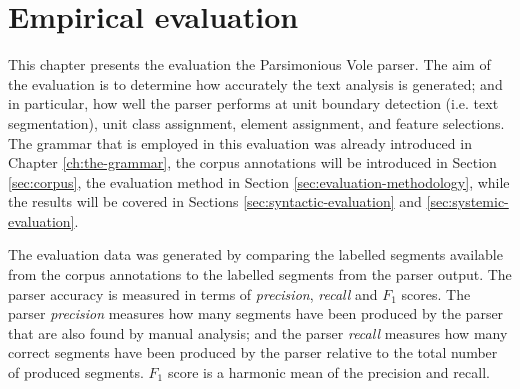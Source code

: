 \chapter{Empirical evaluation}
\label{ch:evaluation}



    This chapter presents the evaluation the Parsimonious Vole parser. The aim of the evaluation is to determine how accurately the text analysis is generated; and in particular, how well the parser performs at unit boundary detection (i.e. text segmentation), unit class assignment, element assignment, and feature selections. The grammar that is employed in this evaluation was already introduced in Chapter \ref{ch:the-grammar}, the corpus annotations will be introduced in Section \ref{sec:corpus}, the evaluation method in Section \ref{sec:evaluation-methodology}, while the results will be covered in Sections  \ref{sec:syntactic-evaluation} and \ref{sec:systemic-evaluation}. 
    
    The evaluation data was generated by comparing the labelled segments  available from the corpus annotations to the labelled segments from the parser output. The parser accuracy is measured in terms of \textit{precision}, \textit{recall} and $F_1$ scores. The parser \textit{precision} measures how many segments have been produced by the parser that are also found by manual analysis; and the parser \textit{recall} measures how many correct segments have been produced by the parser relative to the total number of produced segments. $F_1$ score is a harmonic mean of the precision and recall.
    
